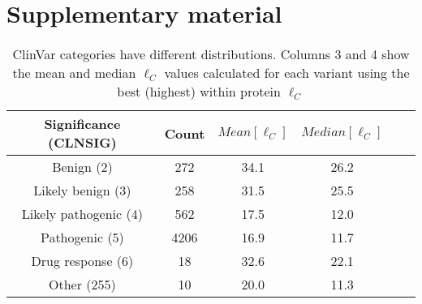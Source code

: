\section{Supplementary material}

%
%



\begin{table}[ht]
\begin{tabular}{|c|c|c|c|c|c|}
\hline 
Significance (CLNSIG)   &   Count  & $Mean[\ell_C]$  &  $Median[\ell_C]$ \\
\hline 
Benign (2)              &    272   &      34.1       &    26.2     \\
Likely benign (3)       &    258   &      31.5       &    25.5     \\
Likely pathogenic (4)   &    562   &      17.5       &    12.0     \\
Pathogenic (5)          &   4206   &      16.9       &    11.7     \\
Drug response (6)       &     18   &      32.6       &    22.1     \\
Other (255)             &     10   &      20.0       &    11.3     \\
\hline 
\end{tabular}
\\
\caption{ClinVar categories have different distributions. Columns 3 and 4 show the mean and median $\ell_C$ values calculated for each variant using the best (highest) within protein $\ell_C$} 
\label{tab:gwas_clinvar}
\end{table}

